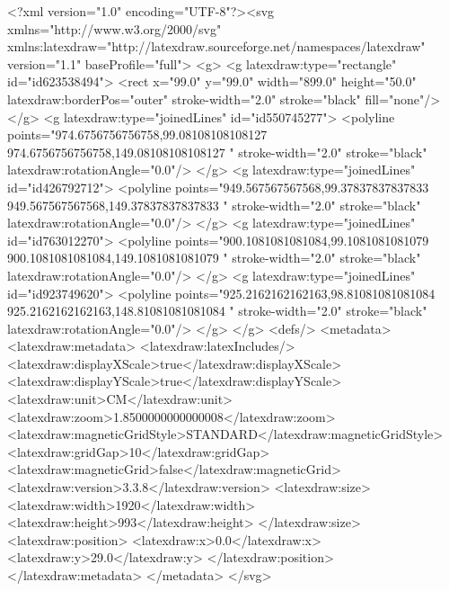 <?xml version="1.0" encoding="UTF-8"?><svg xmlns="http://www.w3.org/2000/svg" xmlns:latexdraw="http://latexdraw.sourceforge.net/namespaces/latexdraw" version="1.1" baseProfile="full">
    <g>
        <g latexdraw:type="rectangle" id="id623538494">
            <rect x="99.0" y="99.0" width="899.0" height="50.0" latexdraw:borderPos="outer" stroke-width="2.0" stroke="black" fill="none"/>
        </g>
        <g latexdraw:type="joinedLines" id="id550745277">
            <polyline points="974.6756756756758,99.08108108108127 974.6756756756758,149.08108108108127 " stroke-width="2.0" stroke="black" latexdraw:rotationAngle="0.0"/>
        </g>
        <g latexdraw:type="joinedLines" id="id426792712">
            <polyline points="949.567567567568,99.37837837837833 949.567567567568,149.37837837837833 " stroke-width="2.0" stroke="black" latexdraw:rotationAngle="0.0"/>
        </g>
        <g latexdraw:type="joinedLines" id="id763012270">
            <polyline points="900.1081081081084,99.1081081081079 900.1081081081084,149.1081081081079 " stroke-width="2.0" stroke="black" latexdraw:rotationAngle="0.0"/>
        </g>
        <g latexdraw:type="joinedLines" id="id923749620">
            <polyline points="925.2162162162163,98.81081081081084 925.2162162162163,148.81081081081084 " stroke-width="2.0" stroke="black" latexdraw:rotationAngle="0.0"/>
        </g>
    </g>
    <defs/>
    <metadata>
        <latexdraw:metadata>
            <latexdraw:latexIncludes/>
            <latexdraw:displayXScale>true</latexdraw:displayXScale>
            <latexdraw:displayYScale>true</latexdraw:displayYScale>
            <latexdraw:unit>CM</latexdraw:unit>
            <latexdraw:zoom>1.8500000000000008</latexdraw:zoom>
            <latexdraw:magneticGridStyle>STANDARD</latexdraw:magneticGridStyle>
            <latexdraw:gridGap>10</latexdraw:gridGap>
            <latexdraw:magneticGrid>false</latexdraw:magneticGrid>
            <latexdraw:version>3.3.8</latexdraw:version>
            <latexdraw:size>
                <latexdraw:width>1920</latexdraw:width>
                <latexdraw:height>993</latexdraw:height>
            </latexdraw:size>
            <latexdraw:position>
                <latexdraw:x>0.0</latexdraw:x>
                <latexdraw:y>29.0</latexdraw:y>
            </latexdraw:position>
        </latexdraw:metadata>
    </metadata>
</svg>
